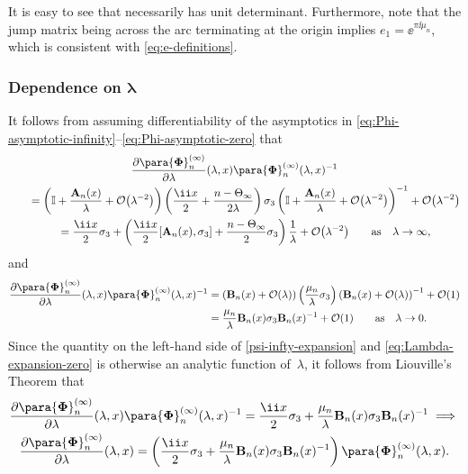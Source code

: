 It is easy to see that  necessarily has unit determinant. Furthermore, note that the jump matrix being  across the arc terminating at the origin implies
$e_1 = \ee^{\pi \ii \mu_n}$, which is consistent with \eqref{eq:e-definitions}.

\subsubsection[Dependence on lambda]{Dependence on $\boldsymbol{\lambda}$}
It follows from assuming differentiability of the asymptotics in \eqref{eq:Phi-asymptotic-infinity}--\eqref{eq:Phi-asymptotic-zero} that
\begin{gather}
 \frac{\partial\para{\boldsymbol \Phi}_{n}^{(\infty)}}{\partial\lambda}(\lambda,x) \para{\boldsymbol \Phi}^{(\infty)}_n(\lambda,x)^{-1}\nonumber\\
\qquad= \left(\mathbb I + \dfrac{\mathbf{A}_{n}(x)}{\lambda} + \mathcal{O}\big( \lambda^{-2}\big) \right)\left( \dfrac{\ii x}{2} + \dfrac{n - \Theta_\infty}{2 \lambda} \right) \sigma_3 \left(\mathbb I + \dfrac{\mathbf{A}_{n}(x)}{\lambda} + \mathcal{O}\big( \lambda^{-2}\big) \right)^{-1} + \mathcal{O}\big(\lambda^{-2}\big)\nonumber\\
 \qquad= \dfrac{\ii x}{2} \sigma_3 + \left( \dfrac{\ii x}{2} [\mathbf{A}_{n}(x), \sigma_3] + \dfrac{n - \Theta_\infty}{2} \sigma_3 \right) \dfrac{1}{\lambda} + \mathcal{O}\big( \lambda^{-2} \big) \qquad \text{as} \quad \lambda \to \infty,
\label{psi-infty-expansion}
\end{gather}
and
\begin{align}
 \frac{\partial\para{\boldsymbol \Phi}_{n}^{(\infty)}}{\partial\lambda}(\lambda,x)\para{\boldsymbol \Phi}^{(\infty)}_n(\lambda,x)^{-1} &= \left( \mathbf{B}_{n}(x) + \mathcal{O}(\lambda) \right) \left( \dfrac{\mu_n}{\lambda} \sigma_3 \right) \left( \mathbf{B}_{n}(x) + \mathcal{O}(\lambda) \right)^{-1} + \mathcal{O}(1)
 \nonumber\\
 &= \dfrac{\mu_n}{\lambda} \mathbf{B}_{n}(x) \sigma_3 \mathbf{B}_{n}(x)^{-1} + \mathcal{O}(1) \qquad \text{as} \quad \lambda \to 0.
\label{eq:Lambda-expansion-zero}
\end{align}
Since the quantity on the left-hand side of \eqref{psi-infty-expansion} and \eqref{eq:Lambda-expansion-zero} is otherwise an analytic function of~$\lambda$, it follows from Liouville's Theorem that
\begin{gather}
 \frac{\partial\para{\boldsymbol \Phi}_{n}^{(\infty)}}{\partial\lambda}(\lambda,x) \para{\boldsymbol \Phi}_n^{(\infty)}(\lambda,x)^{-1} = \dfrac{\ii x}{2} \sigma_3 + \dfrac{\mu_n}{\lambda} \mathbf{B}_{n}(x) \sigma_3 \mathbf{B}_{n}(x)^{-1} \implies\nonumber\\ \frac{\partial\para{\boldsymbol \Phi}_{n}^{(\infty)}}{\partial\lambda}(\lambda,x)= \left( \dfrac{\ii x}{2} \sigma_3 + \dfrac{\mu_n}{\lambda} \mathbf{B}_{n}(x) \sigma_3 \mathbf{B}_{n}(x)^{-1} \right) \para{\boldsymbol \Phi}_n^{(\infty)} (\lambda,x).
 \label{Lax-system-lambda}
\end{gather}
